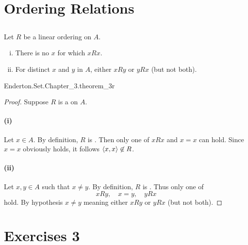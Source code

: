 \documentclass{report}
\begin{document}
\section{Ordering Relations}%

\subsection{}%

  \begin{theorem}[3R]
    Let $R$ be a linear ordering on $A$.
    \begin{enumerate}[(i)]
      \item There is no $x$ for which $xRx$.
      \item For distinct $x$ and $y$ in $A$, either $xRy$ or $yRx$ (but not both).
    \end{enumerate}
  \end{theorem}

    {Enderton.Set.Chapter\_3.theorem\_3r}

  \begin{proof}
    Suppose $R$ is a  on $A$.

    \paragraph{(i)}%

      Let $x \in A$.
      By definition, $R$ is .
      Then only one of $xRx$ and $x = x$ can hold.
      Since $x = x$ obviously holds, it follows $\left< x, x \right> \not\in R$.

    \paragraph{(ii)}%

      Let $x, y \in A$ such that $x \neq y$.
      By definition, $R$ is .
      Thus only one of $$xRy, \quad x = y, \quad yRx$$ hold.
      By hypothesis $x \neq y$ meaning either $xRy$ or $yRx$ (but not both).

  \end{proof}

\section{Exercises 3}%
\end{document}
